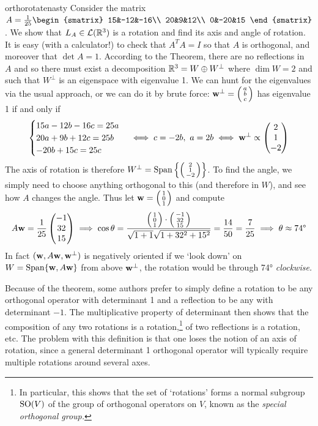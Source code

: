 \begin{example}{}{orthorotatenasty}
Consider the matrix $A=\frac 1{25}\begin{smatrix}
  15&-12&-16\\
  20&9&12\\
  0&-20&15
  \end{smatrix}$. We show that $L_A\in\cL(\R^3)$ is a rotation and find its axis and angle of rotation.\\[5pt]
  It is easy (with a calculator!) to check that $A^TA=I$ so that $A$ is orthogonal, and moreover that $\det A=1$.
  According to the Theorem, there are no reflections in $A$ and so there must exist a decomposition $\R^3=W\oplus W^\perp$ where $\dim W=2$ and such that $W^\perp$ is an eigenspace with eigenvalue 1. We can hunt for the eigenvalues via the usual approach, or we can do it by brute force: $\vw^\perp=\sthreevec abc$ has eigenvalue 1 if and only if
   \[\begin{cases}
   15a-12b-16c=25a\\
   20a+9b+12c=25b\\
   -20b+15c=25c
   \end{cases} \iff c=-2b, \ a=2b \iff \vw^\perp\propto\threevec 21{-2}\]
   The axis of rotation is therefore $W^\perp=\Span\left\{\sthreevec 21{-2}\right\}$. To find the angle, we simply need to choose anything orthogonal to this (and therefore in $W$), and see how $A$ changes the angle. Thus let $\vw=\sthreevec 101$ and compute
   \[A\vw=\frac 1{25}\threevec{-1}{32}{15}\implies \cos\theta=\frac{\sthreevec 101\cdot\sthreevec{-1}{32}{15}}{ \sqrt{1+1}\sqrt{1+32^2+15^2}}
   =\frac{14}{50}=\frac 7{25} \implies \theta\approx \ang{74}\]
   In fact $(\vw,A\vw,\vw^\perp)$ is negatively oriented if we `look down' on $W=\Span\{\vw,A\vw\}$ from above $\vw^\perp$, the rotation would be through  \ang{74} \emph{clockwise.}
\end{example}

Because of the theorem, some authors prefer to simply define a rotation to be any orthogonal operator with determinant 1 and a reflection to be any with determinant $-1$. The multiplicative property of determinant then shows that the composition of any two rotations is a rotation,\footnote{In particular, this shows that the set of `rotations' forms a normal subgroup $\rSO(V)$ of the group of orthogonal operators on $V$, known as the \emph{special orthogonal group.}} of two reflections is a rotation, etc. The problem with this definition is that one loses the notion of an axis of rotation, since a general determinant 1 orthogonal operator will typically require multiple rotations around several axes.


